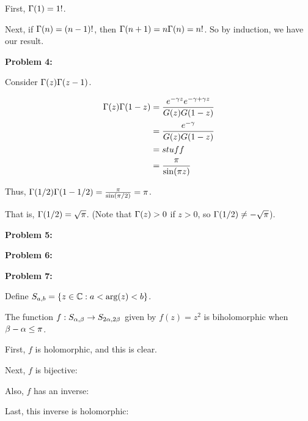 \documentclass[a4paper,12pt]{article}
\begin{document}
First, $\Gamma(1) = 1!$.

Next, if $\Gamma(n) = (n-1)!$, then $\Gamma(n+1) = n\Gamma(n) = n!$. So by induction, we have our result.

\shunt

{\bf Problem 4:}

Consider $\Gamma(z)\Gamma(z-1)$.

\begin{align*}
\Gamma(z)\Gamma(1-z) &= \frac{e^{-\gamma z}e^{-\gamma + \gamma z}}{G(z)G(1-z)}\\
&= \frac{e^{-\gamma}}{G(z)G(1-z)}\\
&= stuff\\
&= \frac{\pi}{\sin(\pi z)}
\end{align*}

Thus, $\Gamma(1/2)\Gamma(1-1/2) = \frac{\pi}{\sin(\pi/2)} = \pi$.

That is, $\Gamma(1/2) = \sqrt{\pi}$. (Note that $\Gamma(z) > 0$ if $z >0$, so $\Gamma(1/2) \neq - \sqrt{\pi}$).

\shunt

{\bf Problem 5:}

\shunt

{\bf Problem 6:}

\shunt

{\bf Problem 7:}

Define $S_{a,b} = \{z \in \mathbb{C}: a< \text{arg}(z) < b\}$.

The function $f: S_{\alpha,\beta} \to S_{2\alpha,2\beta}$ given by $f(z) = z^2$ is biholomorphic when $\beta-\alpha \leq \pi$. %

First, $f$ is holomorphic, and this is clear.

Next, $f$ is bijective: %

Also, $f$ has an inverse: %

Last, this inverse is holomorphic: 

\shunt
\end{document}
